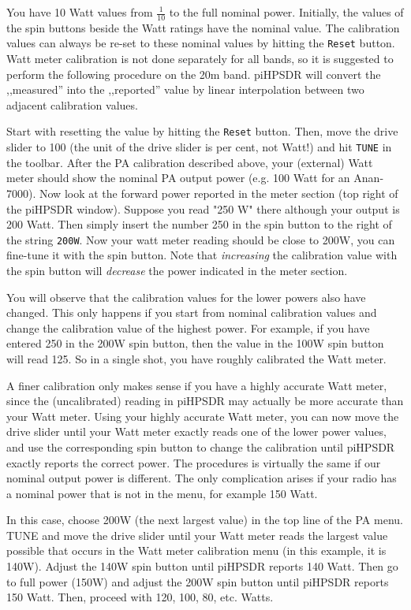 \documentclass[12pt]{book}
\def\rett#1{\texttt{\color{red}#1}}
\def\pH{pi\-HPSDR\xspace}
\begin{document}
You have 10 Watt values from $\frac{1}{10}$ to the full nominal power. Initially,
the values of the spin buttons beside the Watt ratings have the nominal value.
The calibration values can always be re-set to these nominal values by hitting
the \rett{Reset} button. Watt meter calibration is not done separately for all
bands, so it is suggested to perform the following procedure on the 20m band.
\pH will convert the ,,measured'' into the ,,reported'' value by linear
interpolation between two adjacent calibration values.

Start with resetting the value by hitting the \rett{Reset} button. Then, move the
drive slider to 100 (the unit of the drive slider is per cent, not Watt!) and hit
\texttt{TUNE} in the toolbar.
After the PA calibration described above, your (external) Watt meter should
show the nominal PA output power (e.g. 100 Watt for an Anan-7000). Now look at the
forward power reported in the meter section (top right of the \pH window).
Suppose you read "250 W" there although your output is 200 Watt. Then simply
insert the number 250 in the spin button to the right of the string
\rett{200W}. Now your watt meter reading should be close to 200W, you can fine-tune
it with the spin button. Note that \textit{increasing} the calibration value
with the spin button will \textit{decrease} the power indicated in the meter section.

You will observe that the calibration values for the lower powers also have changed.
This only happens if you start from nominal calibration values and change the
calibration value of the highest power. For example, if you have entered 250 in
the 200W spin button, then the value in the 100W spin button will read 125. So in a
single shot, you have roughly calibrated the Watt meter.

A finer calibration only makes sense if you have a highly accurate Watt meter, since
the (uncalibrated) reading in \pH may actually be more accurate than your
Watt meter. Using your highly accurate Watt meter,
you can now move the drive slider until your Watt meter exactly reads one of the
lower power values, and use the corresponding spin button to change the calibration
until \pH exactly reports the correct power.
The procedures is  virtually the same if our nominal output power is different.
The only complication arises if your radio has a nominal power that is not in the menu,
for example 150 Watt.

In this case, choose 200W (the next largest value)
in the top line of the PA menu. TUNE and move the drive
slider until your Watt meter reads the largest value possible that occurs
in the Watt meter calibration menu (in this example, it is 140W). Adjust the
140W spin button until \pH reports 140 Watt. Then go to full power
(150W) and adjust the 200W spin button until \pH reports 150 Watt.
Then, proceed with 120, 100, 80, etc. Watts.
\end{document}
